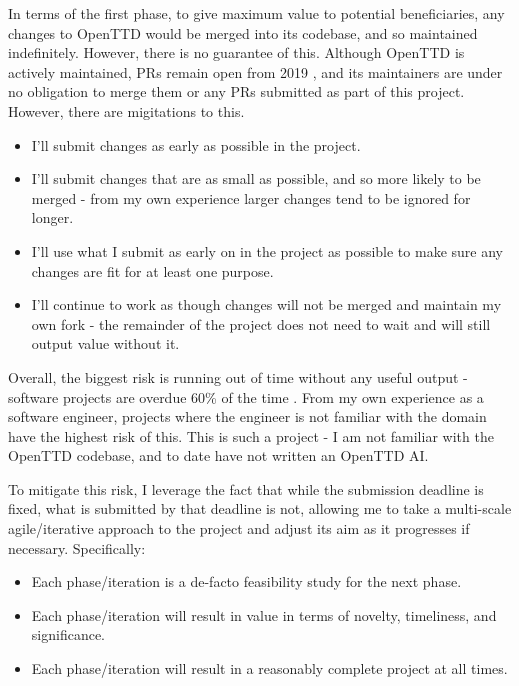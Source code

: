 \documentclass[a4paper,11pt]{article}
\begin{document}
In terms of the first phase, to give maximum value to potential beneficiaries, any changes to OpenTTD would be merged into its codebase, and so maintained indefinitely. However, there is no guarantee of this. Although OpenTTD is actively maintained, PRs remain open from 2019 \cite{openTTDPRs}, and its maintainers are under no obligation to merge them or any PRs submitted as part of this project. However, there are migitations to this.

\begin{itemize}
    \item I'll submit changes as early as possible in the project.
    \item I'll submit changes that are as small as possible, and so more likely to be merged - from my own experience larger changes tend to be ignored for longer.
    \item I'll use what I submit as early on in the project as possible to make sure any changes are fit for at least one purpose.
    \item I'll continue to work as though changes will not be merged and maintain my own fork - the remainder of the project does not need to wait and will still output value without it.
\end{itemize}

Overall, the biggest risk is running out of time without any useful output - software projects are overdue 60\% of the time \cite{chaos2015}. From my own experience as a software engineer, projects where the engineer is not familiar with the domain have the highest risk of this. This is such a project - I am not familiar with the OpenTTD codebase, and to date have not written an OpenTTD AI.

To mitigate this risk, I leverage the fact that while the submission deadline is fixed, what is submitted by that deadline is not, allowing me to take a multi-scale agile/iterative approach to the project and adjust its aim as it progresses if necessary. Specifically:

\begin{itemize}
    \item Each phase/iteration is a de-facto feasibility study for the next phase.
    \item Each phase/iteration will result in value in terms of novelty, timeliness, and significance.
    \item Each phase/iteration will result in a reasonably complete project at all times.
\end{itemize}
\end{document}
